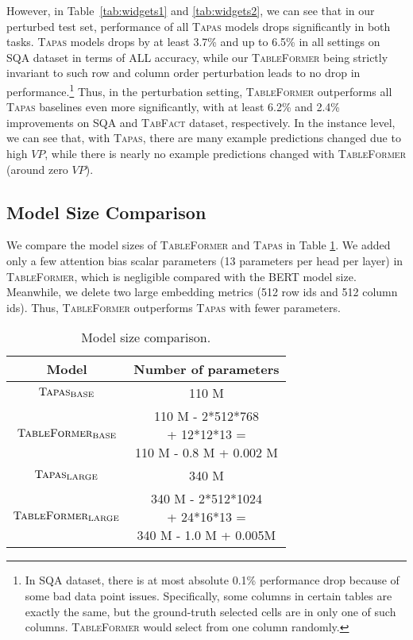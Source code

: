 \documentclass[11pt]{article}
\begin{document}
However, in Table~\ref{tab:widgets1} and \ref{tab:widgets2}, we can see that in our perturbed test set, performance of all \textsc{Tapas} models drops significantly in both tasks. \textsc{Tapas} models drops by at least 3.7\% and up to 6.5\% in all settings on SQA dataset in terms of ALL accuracy, while our \textsc{TableFormer} being strictly invariant to such row and column order perturbation leads to no drop in performance.\footnote{In SQA dataset, there is at most absolute 0.1\% performance drop because of some bad data point issues. Specifically, some columns in certain tables are exactly the same, but the ground-truth selected cells are in only one of such columns. \textsc{TableFormer} would select from one column randomly. } Thus, in the perturbation setting, \textsc{TableFormer} outperforms all \textsc{Tapas} baselines even more significantly, with at least 6.2\% and 2.4\% improvements on SQA and \textsc{TabFact} dataset, respectively. In the instance level, we can see that, with \textsc{Tapas}, there are many example predictions changed due to high $VP$, while there is nearly no example predictions changed with \textsc{TableFormer} (around zero $VP$). 

\subsection{Model Size Comparison}
We compare the model sizes of \textsc{TableFormer} and \textsc{Tapas} in Table \ref{tab:widgets4}. We added only a few attention bias scalar parameters (13 parameters per head per layer) in \textsc{TableFormer}, which is negligible compared with the BERT model size. Meanwhile, we delete two large embedding metrics (512 row ids and 512 column ids). Thus, \textsc{TableFormer} outperforms \textsc{Tapas} with fewer parameters.


\begin{table}[t]
\small
\centering
\begin{tabular}{cc}
\toprule
Model & Number of parameters            \\\midrule
$\textsc{Tapas}_{\text{BASE}}$                                    & 110 M                                                    \\\hline
$\textsc{TableFormer}_{\text{BASE}}$                             & \makecell{110 M - 2*512*768 \\ + 12*12*13 = \\110 M - 0.8 M + 0.002 M}   \\\midrule
$\textsc{Tapas}_{\text{LARGE}}$                                   & 340 M                                                   \\\hline
$\textsc{TableFormer}_{\text{LARGE}}$                             & \makecell{340 M - 2*512*1024 \\+ 24*16*13 = \\340 M - 1.0 M + 0.005M} 
\\\bottomrule
\end{tabular}
\caption{\label{tab:widgets4}Model size comparison.}
\end{table}
\end{document}
